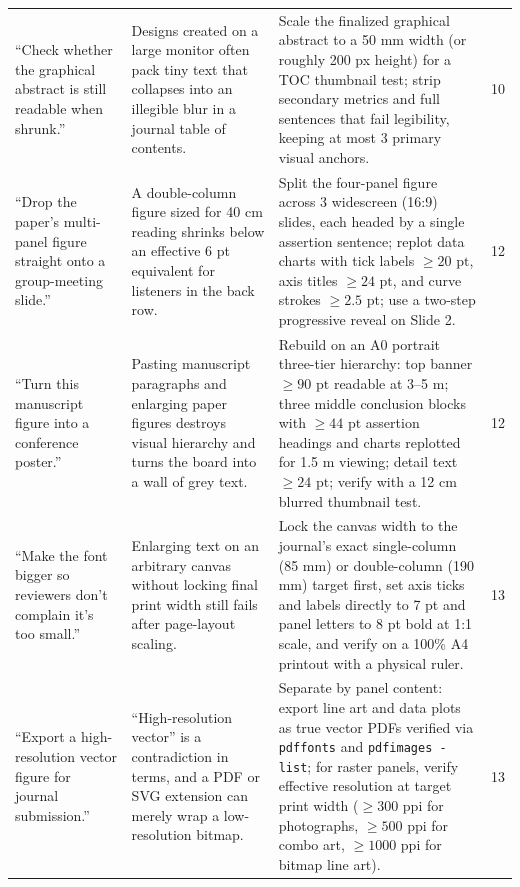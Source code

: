 \begin{longtable}{@{}p{26mm}p{28mm}p{56mm}p{10mm}@{}}
``Check whether the graphical abstract is still readable when shrunk.'' & Designs created on a large monitor often pack tiny text that collapses into an illegible blur in a journal table of contents. & Scale the finalized graphical abstract to a 50 mm width (or roughly 200 px height) for a TOC thumbnail test; strip secondary metrics and full sentences that fail legibility, keeping at most 3 primary visual anchors. & 10 \\
``Drop the paper's multi-panel figure straight onto a group-meeting slide.'' & A double-column figure sized for 40 cm reading shrinks below an effective 6 pt equivalent for listeners in the back row. & Split the four-panel figure across 3 widescreen (16:9) slides, each headed by a single assertion sentence; replot data charts with tick labels $\ge 20\text{ pt}$, axis titles $\ge 24\text{ pt}$, and curve strokes $\ge 2.5\text{ pt}$; use a two-step progressive reveal on Slide 2. & 12 \\
``Turn this manuscript figure into a conference poster.'' & Pasting manuscript paragraphs and enlarging paper figures destroys visual hierarchy and turns the board into a wall of grey text. & Rebuild on an A0 portrait three-tier hierarchy: top banner $\ge 90\text{ pt}$ readable at 3--5 m; three middle conclusion blocks with $\ge 44\text{ pt}$ assertion headings and charts replotted for 1.5 m viewing; detail text $\ge 24\text{ pt}$; verify with a 12 cm blurred thumbnail test. & 12 \\
``Make the font bigger so reviewers don't complain it's too small.'' & Enlarging text on an arbitrary canvas without locking final print width still fails after page-layout scaling. & Lock the canvas width to the journal's exact single-column (85 mm) or double-column (190 mm) target first, set axis ticks and labels directly to 7 pt and panel letters to 8 pt bold at 1:1 scale, and verify on a 100\% A4 printout with a physical ruler. & 13 \\
``Export a high-resolution vector figure for journal submission.'' & ``High-resolution vector'' is a contradiction in terms, and a PDF or SVG extension can merely wrap a low-resolution bitmap. & Separate by panel content: export line art and data plots as true vector PDFs verified via \texttt{pdffonts} and \texttt{pdfimages -list}; for raster panels, verify effective resolution at target print width ($\ge 300\text{ ppi}$ for photographs, $\ge 500\text{ ppi}$ for combo art, $\ge 1000\text{ ppi}$ for bitmap line art). & 13 \\
\end{longtable}
\endgroup

